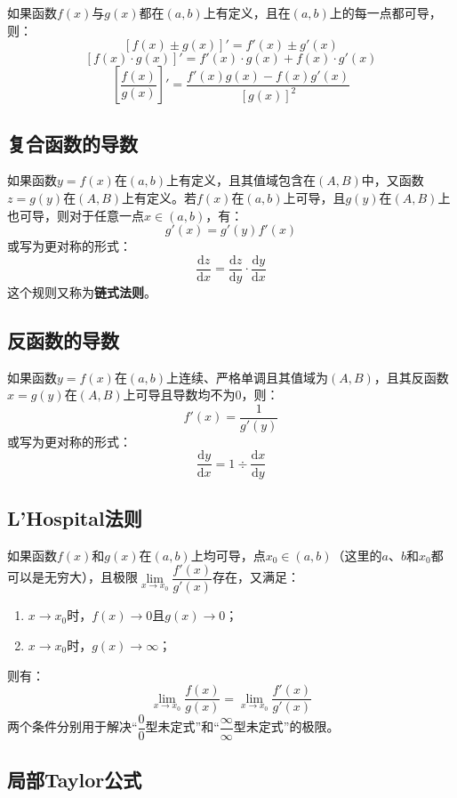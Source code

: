\documentclass[fontset=none,openany,a4paper]{ctexbook}
\begin{document}
如果函数$f(x)$与$g(x)$都在$(a,b)$上有定义，且在$(a,b)$上的每一点都可导，则：
\[
[f(x) \pm g(x)]' = f'(x) \pm g'(x)
\]
\[
[f(x) \cdot g(x)]' = f'(x) \cdot g(x) + f(x) \cdot g'(x)
\]
\[
\left[\frac{f(x)}{g(x)}\right]' = \frac{f'(x)g(x)-f(x)g'(x)}{[g(x)]^2}
\]

\subsection{复合函数的导数}

如果函数$y=f(x)$在$(a,b)$上有定义，且其值域包含在$(A,B)$中，又函数$z=g(y)$在$(A,B)$上有定义。若$f(x)$在$(a,b)$上可导，且$g(y)$在$(A,B)$上也可导，则对于任意一点$x\in(a,b)$，有：
\[
g'(x) = g'(y)f'(x)
\]
或写为更对称的形式：
\[
\frac{\mathrm{d}z}{\mathrm{d}x} = \frac{\mathrm{d}z}{\mathrm{d}y} \cdot \frac{\mathrm{d}y}{\mathrm{d}x}
\]
这个规则又称为\textbf{链式法则}。

\subsection{反函数的导数}

如果函数$y=f(x)$在$(a,b)$上连续、严格单调且其值域为$(A,B)$，且其反函数$x=g(y)$在$(A,B)$上可导且导数均不为0，则：
\[
f'(x) = \frac{1}{g'(y)}
\]
或写为更对称的形式：
\[
\frac{\mathrm{d}y}{\mathrm{d}x} = 1 \div \frac{\mathrm{d}x}{\mathrm{d}y}
\]

\subsection{L'Hospital法则}

如果函数$f(x)$和$g(x)$在$(a,b)$上均可导，点$x_0\in(a,b)$（这里的$a$、$b$和$x_0$都可以是无穷大），且极限$\lim\limits_{x\to x_0}\dfrac{f'(x)}{g'(x)}$存在，又满足：
\begin{enumerate}
    \item $x\to x_0$时，$f(x)\to0$且$g(x)\to0$；

    \item $x\to x_0$时，$g(x)\to\infty$；
\end{enumerate}
则有：
\[
\lim_{x\to x_0}\frac{f(x)}{g(x)} = \lim_{x\to x_0}\frac{f'(x)}{g'(x)}
\]
两个条件分别用于解决“$\dfrac{0}{0}$型未定式”和“$\dfrac{\infty}{\infty}$型未定式”的极限。

\subsection{局部Taylor公式}
\end{document}
